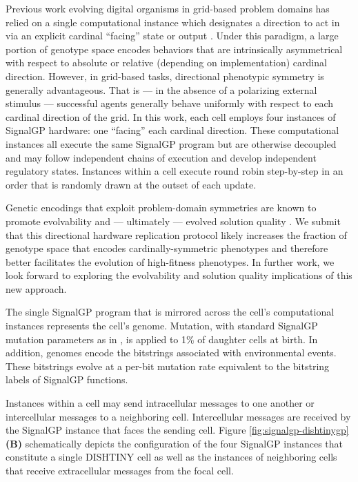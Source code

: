 Previous work evolving digital organisms in grid-based problem domains has relied on a single computational instance which designates a direction to act in via an explicit cardinal ``facing'' state or output \cite{goldsby2014evolutionary, goldsby2018serendipitous, grabowski2010early, biswas2014causes, lalejini2018evolving}.
Under this paradigm, a large portion of genotype space encodes behaviors that are intrinsically asymmetrical with respect to absolute or relative (depending on implementation) cardinal direction.
However, in grid-based tasks, directional phenotypic symmetry is generally advantageous.
That is --- in the absence of a polarizing external stimulus --- successful agents generally behave uniformly with respect to each cardinal direction of the grid.
In this work, each cell employs four instances of SignalGP hardware: one ``facing'' each cardinal direction.
These computational instances all execute the same SignalGP program but are otherwise decoupled and may follow independent chains of execution and develop independent regulatory states.
Instances within a cell execute round robin step-by-step in an order that is randomly drawn at the outset of each update.

Genetic encodings that exploit problem-domain symmetries are known to promote evolvability and --- ultimately --- evolved solution quality \cite{clune2011performance, cheney2014unshackling}.
We submit that this directional hardware replication protocol likely increases the fraction of genotype space that encodes cardinally-symmetric phenotypes and therefore better facilitates the evolution of high-fitness phenotypes.
In further work, we look forward to exploring the evolvability and solution quality implications of this new approach.

The single SignalGP program that is mirrored across the cell's computational instances represents the cell's genome.
Mutation, with standard SignalGP mutation parameters as in \cite{lalejini2018evolving}, is applied to 1\% of daughter cells at birth.
In addition, genomes encode the bitstrings associated with environmental events.
These bitstrings evolve at a per-bit mutation rate equivalent to the bitstring labels of SignalGP functions.

Instances within a cell may send intracellular messages to one another or intercellular messages to a neighboring cell.
Intercellular messages are received by the SignalGP instance that faces the sending cell.
Figure \ref{fig:signalgp-dishtinygp}\textbf{(B)} schematically depicts the configuration of the four SignalGP instances that constitute a single DISHTINY cell as well as the instances of neighboring cells that receive extracellular messages from the focal cell.

